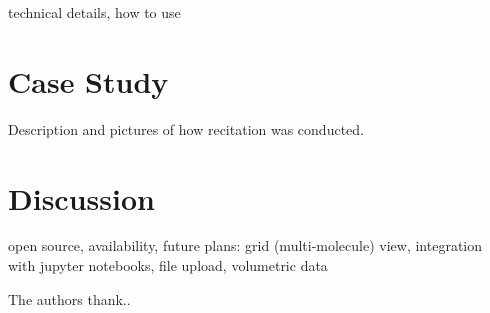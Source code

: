 \documentclass[journal=jceda8,manuscript=article]{achemso}
\begin{document}
technical details, how to use

\section{Case Study}

Description and pictures of how recitation was conducted.

\section{Discussion}

open source, availability, future plans: grid (multi-molecule) view, integration with jupyter notebooks, file upload, volumetric data

\begin{acknowledgement}



The authors thank.. 

\end{acknowledgement}



\end{document}

